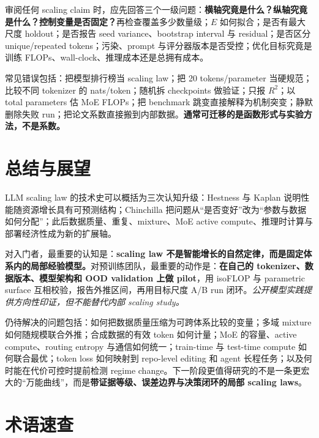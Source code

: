 \documentclass[UTF8,10pt,a4paper,fontset=none]{ctexart}
\newcommand{\term}[1]{\textbf{#1}}
\def\BilingualAnchorPrefix{en}
\let\BilingualOriginalAppendix\appendix
\renewcommand{\appendix}{%
  \BilingualOriginalAppendix
  \renewcommand*{\theHsection}{\BilingualAnchorPrefix.appendix.\Alph{section}}%
}
\begin{document}
审阅任何 scaling claim 时，应先回答三个一级问题：\textbf{横轴究竟是什么？纵轴究竟是什么？控制变量是否固定？}再检查覆盖多少数量级；$E$ 如何拟合；是否有最大尺度 holdout；是否报告 seed variance、bootstrap interval 与 residual；是否区分 unique/repeated tokens；污染、prompt 与评分器版本是否受控；优化目标究竟是训练 FLOPs、wall-clock、推理成本还是总拥有成本。

常见错误包括：把模型排行榜当 scaling law；把 20 tokens/parameter 当硬规范；比较不同 tokenizer 的 nats/token；随机拆 checkpoints 做验证；只报 $R^2$；以 total parameters 估 MoE FLOPs；把 benchmark 跳变直接解释为机制突变；静默删除失败 run；把论文系数直接搬到内部数据。\textbf{通常可迁移的是函数形式与实验方法，不是系数。}

\section{总结与展望}

LLM scaling law 的技术史可以概括为三次认知升级：Hestness 与 Kaplan 说明性能随资源增长具有可预测结构；Chinchilla 把问题从“是否变好”改为“参数与数据如何分配”；此后数据质量、重复、mixture、MoE active compute、推理时计算与部署经济性成为新的扩展轴。

对入门者，最重要的认知是：\textbf{scaling law 不是智能增长的自然定律，而是固定体系内的局部经验模型。}对预训练团队，最重要的动作是：\textbf{在自己的 tokenizer、数据版本、模型架构和 OOD validation 上做 pilot}，用 isoFLOP 与 parametric surface 互相校验，报告外推区间，再用目标尺度 A/B run 闭环。\textit{公开模型实践提供方向性印证，但不能替代内部 scaling study。}

仍待解决的问题包括：如何把数据质量压缩为可跨体系比较的变量；多域 mixture 如何随规模联合外推；合成数据的有效 token 如何计量；MoE 的容量、active compute、routing entropy 与通信如何统一；train-time 与 test-time compute 如何联合最优；token loss 如何映射到 repo-level editing 和 agent 长程任务；以及何时能在代价可控时提前检测 regime change。下一阶段更值得研究的不是一条更宏大的“万能曲线”，而是\term{带证据等级、误差边界与决策闭环的局部 scaling laws}。

\appendix
\clearpage
\section{术语速查}
\label{zh:app:glossary}
\end{document}
